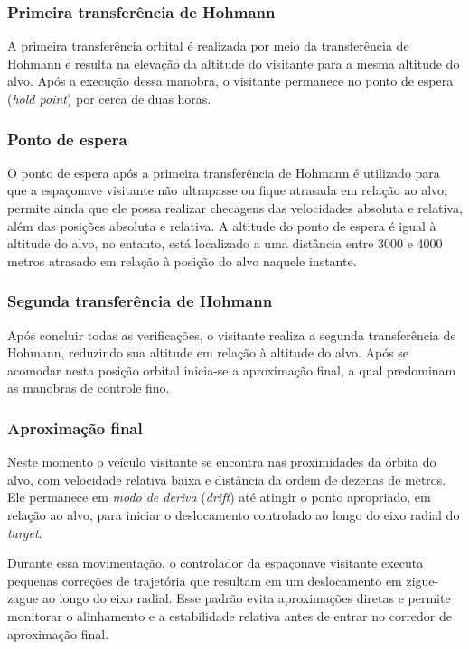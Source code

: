 \subsubsection{Primeira transferência de Hohmann}

A primeira transferência orbital é realizada por meio da transferência de Hohmann e resulta na elevação da altitude do visitante para a mesma altitude do alvo.
Após a execução dessa manobra, o visitante permanece no ponto de espera (\emph{hold point}) por cerca de duas horas.

\subsubsection{Ponto de espera}

O ponto de espera após a primeira transferência de Hohmann é utilizado para que a espaçonave visitante não ultrapasse ou fique atrasada em relação ao alvo; permite ainda que ele possa realizar checagens das velocidades absoluta e relativa, além das posições absoluta e relativa.
A altitude do ponto de espera é igual à altitude do alvo, no entanto, está localizado a uma distância entre 3000 e 4000 metros atrasado em relação à posição do alvo naquele instante.

\subsubsection{Segunda transferência de Hohmann}

Após concluir todas as verificações, o visitante realiza a segunda transferência de Hohmann, reduzindo sua altitude em relação à altitude do alvo.
Após se acomodar nesta posição orbital inicia-se a aproximação final, a qual predominam as manobras de controle fino.

\subsubsection{Aproximação final}
\label{sec:aproximacao_final}

Neste momento o veículo visitante se encontra nas proximidades da órbita do alvo, com velocidade relativa baixa e distância da ordem de dezenas de metros.
Ele permanece em \textit{modo de deriva} (\textit{drift}) até atingir o ponto apropriado, em relação ao alvo, para iniciar o deslocamento controlado ao longo do eixo radial do \textit{target}.

Durante essa movimentação, o controlador da espaçonave visitante executa pequenas correções de trajetória que resultam em um deslocamento em zigue-zague ao longo do eixo radial.
Esse padrão evita aproximações diretas e permite monitorar o alinhamento e a estabilidade relativa antes de entrar no corredor de aproximação final.

